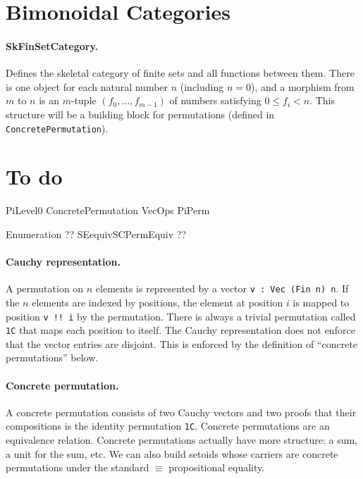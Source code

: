 \documentclass{article}
\begin{document}
\section{Bimonoidal Categories} 

\paragraph*{SkFinSetCategory.} Defines the skeletal category of finite
sets and all functions between them. There is one object for each
natural number $n$ (including $n=0$), and a morphism from $m$ to $n$
is an $m$-tuple $(f_0,\ldots,f_{m−1})$ of numbers satisfying
$0 \leq f_i < n$. This structure will be a building block for
permutations (defined in \texttt{ConcretePermutation}).

\section{To do}

PiLevel0
ConcretePermutation
VecOps
PiPerm

Enumeration ??
SEequivSCPermEquiv ??

\paragraph*{Cauchy representation.} A permutation on $n$ elements is
represented by a vector \texttt{v : Vec (Fin n) n}. If the $n$
elements are indexed by positions, the element at position $i$ is
mapped to position \texttt{v !! i} by the permutation. There is always
a trivial permutation called \texttt{1C} that maps each position to
itself. The Cauchy representation does not enforce that the vector
entries are disjoint. This is enforced by the definition of ``concrete
permutations'' below.

\paragraph*{Concrete permutation.} A concrete permutation consists of
two Cauchy vectors and two proofs that their compositions is the
identity permutation \texttt{1C}. Concrete permutations are an
equivalence relation. Concrete permutations actually have more
structure: a sum, a unit for the sum, etc. We can also build setoids
whose carriers are concrete permutations under the standard $\equiv$
propositional equality.

\end{document}

